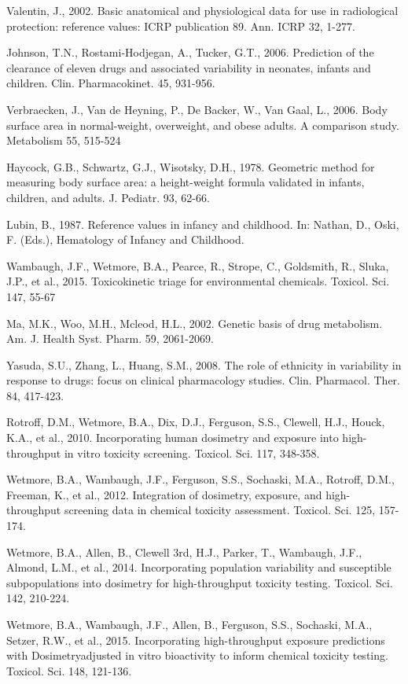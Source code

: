 \documentclass[a4paper]{book}
\begin{document}
\begin{References}
Valentin, J., 2002. Basic anatomical and physiological data for use in radiological protection:
reference values: ICRP publication 89. Ann. ICRP 32, 1-277.

Johnson, T.N., Rostami-Hodjegan, A., Tucker, G.T., 2006. Prediction of the clearance of
eleven drugs and associated variability in neonates, infants and children. Clin.
Pharmacokinet. 45, 931-956.

Verbraecken, J., Van de Heyning, P., De Backer, W., Van Gaal, L., 2006. Body surface area
in normal-weight, overweight, and obese adults. A comparison study. Metabolism 55,
515-524

Haycock, G.B., Schwartz, G.J., Wisotsky, D.H., 1978. Geometric method for measuring
body surface area: a height-weight formula validated in infants, children, and adults.
J. Pediatr. 93, 62-66.

Lubin, B., 1987. Reference values in infancy and childhood. In: Nathan, D., Oski, F. (Eds.),
Hematology of Infancy and Childhood.

Wambaugh, J.F., Wetmore, B.A., Pearce, R., Strope, C., Goldsmith, R., Sluka, J.P., et al.,
2015. Toxicokinetic triage for environmental chemicals. Toxicol. Sci. 147, 55-67

Ma, M.K., Woo, M.H., Mcleod, H.L., 2002. Genetic basis of drug metabolism. Am. J.
Health Syst. Pharm. 59, 2061-2069.

Yasuda, S.U., Zhang, L., Huang, S.M., 2008. The role of ethnicity in variability in response
to drugs: focus on clinical pharmacology studies. Clin. Pharmacol. Ther. 84, 417-423.

Rotroff, D.M., Wetmore, B.A., Dix, D.J., Ferguson, S.S., Clewell, H.J., Houck, K.A., et al.,
2010. Incorporating human dosimetry and exposure into high-throughput in vitro
toxicity screening. Toxicol. Sci. 117, 348-358.

Wetmore, B.A., Wambaugh, J.F., Ferguson, S.S., Sochaski, M.A., Rotroff, D.M., Freeman,
K., et al., 2012. Integration of dosimetry, exposure, and high-throughput screening
data in chemical toxicity assessment. Toxicol. Sci. 125, 157-174.

Wetmore, B.A., Allen, B., Clewell 3rd, H.J., Parker, T., Wambaugh, J.F., Almond, L.M.,
et al., 2014. Incorporating population variability and susceptible subpopulations into
dosimetry for high-throughput toxicity testing. Toxicol. Sci. 142, 210-224.

Wetmore, B.A., Wambaugh, J.F., Allen, B., Ferguson, S.S., Sochaski, M.A., Setzer, R.W.,
et al., 2015. Incorporating high-throughput exposure predictions with Dosimetryadjusted
in vitro bioactivity to inform chemical toxicity testing. Toxicol. Sci. 148,
121-136.
\end{References}
\end{document}
